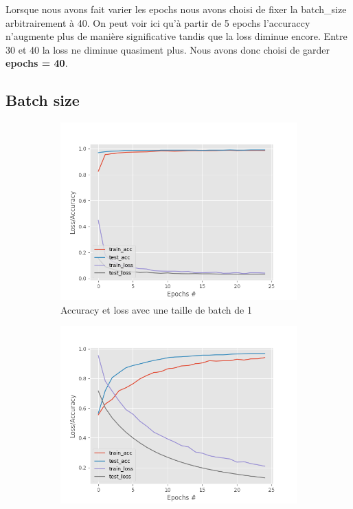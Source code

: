 Lorsque nous avons fait varier les epochs nous avons choisi de fixer la batch\_size arbitrairement à 40. On peut voir ici qu’à partir de 5 epochs l’accuraccy n’augmente plus de manière significative tandis que la loss diminue encore. Entre 30 et 40 la loss ne diminue quasiment plus. Nous avons donc choisi de garder \textbf{epochs = 40}.\\

\subsection{Batch size}

\begin{figure}[H]
  \centering
  \begin{subfigure}[b]{0.4\linewidth}
    \includegraphics[width=\linewidth]{resources/loss-accuracy-25-1.png}
    \caption{Accuracy et loss avec une taille de batch de 1}
  \end{subfigure}
  \begin{subfigure}[b]{0.4\linewidth}
    \includegraphics[width=\linewidth]{resources/loss-accuracy-25-129.png}

\end{subfigure}
\end{figure}
